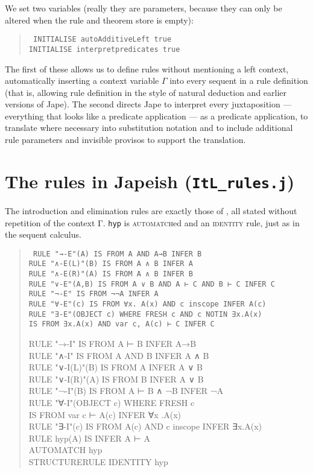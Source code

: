 We set two variables (really they are parameters, because they can only be altered when the rule and theorem store is empty):
\begin{quote}\tt\small
INITIALISE autoAdditiveLeft true \\
INITIALISE interpretpredicates true
\end{quote}

The first of these allows us to define rules without mentioning a left context, automatically inserting a context variable \ensuremath{\Gamma} into every sequent in a rule definition (that is, allowing rule definition in the style of natural deduction and earlier versions of Jape). The second directs Jape to interpret every juxtaposition --- everything that looks like a predicate application --- as a predicate application, to translate where necessary into substitution notation and to include additional rule parameters and invisible provisos to support the translation.

\section{The rules in Japeish (\texttt{ItL\_rules.j})}

The introduction and elimination rules are exactly those of , all stated without repetition of the context Γ. \texttt{hyp} is \textsc{automatch}ed and an \textsc{identity} rule, just as in the sequent calculus.
\begin{quote}\tt\small
RULE "→-E"(A)      IS FROM A AND A→B INFER B \\
RULE "∧-E(L)"(B)   IS FROM A ∧ B INFER A \\
RULE "∧-E(R)"(A)   IS FROM A ∧ B INFER B \\
RULE "∨-E"(A,B)    IS FROM A ∨ B AND A ⊢ C AND B ⊢ C INFER C \\
RULE "¬-E"         IS FROM ¬¬A INFER A \\
RULE "∀-E"(c)      IS FROM ∀x. A(x) AND c inscope INFER A(c) \\
RULE "∃-E"(OBJECT c) WHERE FRESH c AND c NOTIN ∃x.A(x) \\
\tab IS FROM ∃x.A(x) AND var c, A(c) ⊢ C INFER C

RULE "→-I"         IS FROM A ⊢ B INFER A→B \\
RULE "∧-I"         IS FROM A AND B INFER A ∧ B \\
RULE "∨-I(L)"(B)   IS FROM A INFER A ∨ B \\
RULE "∨-I(R)"(A)   IS FROM B INFER A ∨ B \\
RULE "¬-I"(B)      IS FROM A ⊢ B ∧ ¬B INFER ¬A \\
RULE "∀-I"(OBJECT c) WHERE FRESH c \\
\tab IS FROM var c ⊢ A(c) INFER ∀x .A(x) \\
RULE "∃-I"(c)      IS FROM A(c) AND c inscope INFER ∃x.A(x) \\

RULE hyp(A) IS INFER A ⊢ A \\
AUTOMATCH hyp \\
STRUCTURERULE IDENTITY   hyp
\end{quote}

